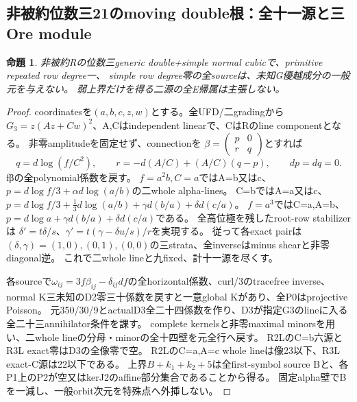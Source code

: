\documentclass[a4paper,11pt]{ltjsarticle}
\newtheorem{proposition}{命題}[section]
\theoremstyle{definition}
\begin{document}
\subsection{非被約位数三21のmoving double根：全十一源と三Ore module}
\begin{proposition}\label{prop:plane-nonreduced-m3-moving-double-all-G}
非被約Rの位数三generic double+simple normal cubicで、primitive repeated row degree一、
simple row degree零の全sourceは、未知G優越成分の一般元を与えない。
弱上界だけを得る二源の全E帰属は主張しない。
\end{proposition}
\begin{proof}
coordinatesを$(a,b,c,z,w)$とする。全UFD/二gradingから
$G_3=z(Az+Cw)^2$、A,Cはindependent linearで、CはRのline componentとなる。
非零amplitudeを固定せず、connectionを
$\beta=\left(\begin{smallmatrix}p&0\\r&q\end{smallmatrix}\right)$とすれば
\[
 q=d\log(f/C^2),\qquad r=-d(A/C)+(A/C)(q-p),\qquad dp=dq=0.
\]
fβの全polynomial係数を戻す。
$f=a^2b,C=a$ではA=b又はc、
$p=d\log f/3+\alpha d\log(a/b)$の二whole alpha-lines。
C=bではA=a又はc、
$p=d\log f/3+\tfrac13d\log(a/b)+\gamma d(b/a)+\delta d(c/a)$。
$f=a^3$ではC=a,A=b、$p=d\log a+\gamma d(b/a)+\delta d(c/a)$である。
全高位極を残したroot-row stabilizerは
$\delta'=t\delta/s$、$\gamma'=t(\gamma-\delta u/s)/r$を実現する。
従って各exact pairは$(\delta,\gamma)=(1,0),(0,1),(0,0)$の三strata、全inverseはminus shearと非零diagonal逆。
これで二whole lineと九fixed、計十一源を尽くす。

各sourceで$\omega_{ij}=3f\beta_{ij}-\delta_{ij}df$の全horizontal係数、curl/3のtracefree inverse、
normal K三未知のD2零三十係数を戻すと一意global Kがあり、全P0はprojective Poisson。
元350/30/9とactualD3全二十四係数を作り、D3が指定G3のlineに入る全二十三annihilator条件を課す。
complete kernelsと非零maximal minorsを用い、二whole lineの分母・minorの全十四壁を元全行へ戻す。
R2LのC=b六源とR3L exact零はD3の全像零で空。
R2LのC=a,A=c whole lineは像23以下、R3L exact-C源は22以下である。
上界$B+k_1+k_2+5$は全first-symbol source Bと、各P1上のP2が空又はkerJ2のaffine部分集合であることから得る。
固定alpha壁でBを一減し、一般orbit次元を特殊点へ外挿しない。


\end{proof}
\end{document}

